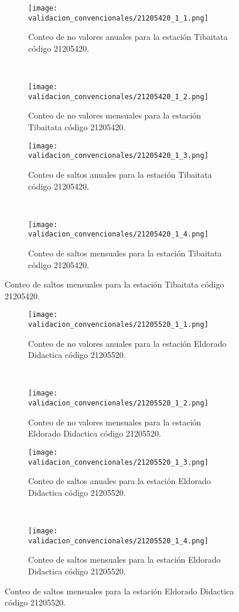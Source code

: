           
\begin{figure}[H]
	\centering
	\begin{subfigure}[normla]{0.4\textwidth}
	\texttt{[image: validacion\_convencionales/21205420\_1\_1.png]}
		\caption{Conteo de no valores anuales para la estación Tibaitata código 21205420.}
		\label{subfig:a1}
		\end{subfigure}
		~
    \begin{subfigure}[normla]{0.4\textwidth}
	\texttt{[image: validacion\_convencionales/21205420\_1\_2.png]}
		\caption{Conteo de no valores mensuales para la estación Tibaitata código 21205420.}
		\label{subfig:a2}
		\end{subfigure}
		
    \begin{subfigure}[normla]{0.4\textwidth}
	\texttt{[image: validacion\_convencionales/21205420\_1\_3.png]}
		\caption{Conteo de saltos anuales para la estación Tibaitata código 21205420.}
		\label{subfig:a1}
		\end{subfigure}
		~
    \begin{subfigure}[normla]{0.4\textwidth}
	\texttt{[image: validacion\_convencionales/21205420\_1\_4.png]}
		\caption{Conteo de saltos mensuales para la estación Tibaitata código 21205420.}
		\label{subfig:a2}
		\end{subfigure}

	
\end{figure}
           
\begin{figure}[H]\ContinuedFloat
\centering
	\begin{subfigure}[normla]{0.4\textwidth}
	\texttt{[image: validacion\_convencionales/21205520\_1\_1.png]}
		\caption{Conteo de no valores anuales para la estación Eldorado Didactica código 21205520.}
		\label{subfig:a1}
		\end{subfigure}
		~
    \begin{subfigure}[normla]{0.4\textwidth}
	\texttt{[image: validacion\_convencionales/21205520\_1\_2.png]}
		\caption{Conteo de no valores mensuales para la estación Eldorado Didactica código 21205520.}
		\label{subfig:a2}
		\end{subfigure}
		
    \begin{subfigure}[normla]{0.4\textwidth}
	\texttt{[image: validacion\_convencionales/21205520\_1\_3.png]}
		\caption{Conteo de saltos anuales para la estación Eldorado Didactica código 21205520.}
		\label{subfig:a1}
		\end{subfigure}
		~
    \begin{subfigure}[normla]{0.4\textwidth}
	\texttt{[image: validacion\_convencionales/21205520\_1\_4.png]}
		\caption{Conteo de saltos mensuales para la estación Eldorado Didactica código 21205520.}
		\label{subfig:a2}
		\end{subfigure}

	
\end{figure}
           
